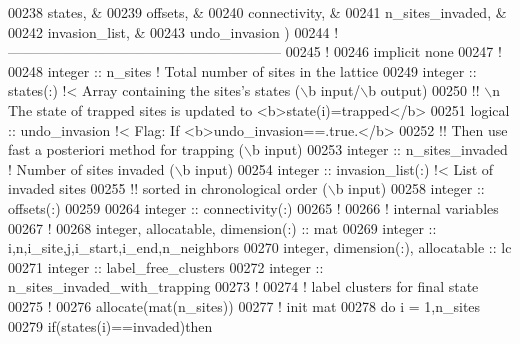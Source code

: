 \begin{DoxyCode}
00238                                           states,            &
00239                                           offsets,           &
00240                                           connectivity,      &
00241                                           n\_sites\_invaded,   &
00242                                           invasion\_list,     &
00243                                           undo\_invasion      )
00244   \textcolor{comment}{!-----------------------------------------------------------}
00245     \textcolor{comment}{!}
00246     \textcolor{keyword}{implicit none}
00247     \textcolor{comment}{!}
00248     \textcolor{keywordtype}{integer} :: n\_sites \textcolor{comment}{! Total number of sites in the lattice}
00249     \textcolor{keywordtype}{integer} :: states(:) \textcolor{comment}{!< Array containing the sites's states (\(\backslash\)b input/\(\backslash\)b
       output)}
00250     \textcolor{comment}{!! \(\backslash\)n The state of trapped sites is updated to <b>state(i)=trapped</b>}
00251     \textcolor{keywordtype}{logical} :: undo\_invasion \textcolor{comment}{!< Flag: If <b>undo\_invasion==.true.</b>}
00252     \textcolor{comment}{!! Then use fast a posteriori method for trapping (\(\backslash\)b input)}
00253     \textcolor{keywordtype}{integer} :: n\_sites\_invaded \textcolor{comment}{! Number of sites invaded (\(\backslash\)b input)}
00254     \textcolor{keywordtype}{integer} :: invasion\_list(:) \textcolor{comment}{!< List of invaded sites }
00255     \textcolor{comment}{!! sorted in chronological order (\(\backslash\)b input)}
00258     \textcolor{keywordtype}{integer} :: offsets(:)
00259 
00264     \textcolor{keywordtype}{integer} :: connectivity(:)
00265     \textcolor{comment}{!}
00266     \textcolor{comment}{! internal variables}
00267     \textcolor{comment}{!}
00268     \textcolor{keywordtype}{integer}, \textcolor{keywordtype}{allocatable}, \textcolor{keywordtype}{dimension(:)} :: mat
00269     \textcolor{keywordtype}{integer} :: i,n,i\_site,j,i\_start,i\_end,n\_neighbors
00270     \textcolor{keywordtype}{integer}, \textcolor{keywordtype}{dimension(:)}, \textcolor{keywordtype}{allocatable} :: lc
00271     \textcolor{keywordtype}{integer} :: label\_free\_clusters
00272     \textcolor{keywordtype}{integer} :: n\_sites\_invaded\_with\_trapping
00273     \textcolor{comment}{!}
00274     \textcolor{comment}{! label clusters for final state}
00275     \textcolor{comment}{!}
00276     \textcolor{keyword}{allocate}(mat(n\_sites))
00277     \textcolor{comment}{! init mat}
00278     \textcolor{keyword}{do} i = 1,n\_sites
00279        \textcolor{keyword}{if}(states(i)==invaded)\textcolor{keyword}{then}

\end{DoxyCode}
